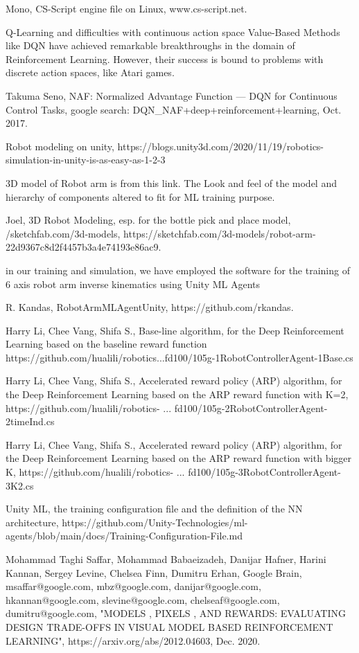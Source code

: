 \documentclass[conference]{IEEEtran}
\begin{document}
\begin{thebibliography}{1}
Mono, CS-Script engine file on Linux, 
www.cs-script.net.  

Q-Learning and difficulties with continuous action space
Value-Based Methods like DQN have achieved remarkable breakthroughs in the domain of Reinforcement Learning. However, their success is bound to problems with discrete action spaces, like Atari games.

Takuma Seno, 
NAF: Normalized Advantage Function — DQN for Continuous Control Tasks, 
google search: DQN\_NAF+deep+reinforcement+learning, 
Oct. 2017.   

Robot modeling on unity,  
https://blogs.unity3d.com/2020/11/19/robotics-simulation-in-unity-is-as-easy-as-1-2-3 

3D model of Robot arm is from this link. The Look and feel of the model and hierarchy of components altered to fit for ML training purpose.

Joel, 3D Robot Modeling, esp. for the bottle pick and place model, 
/sketchfab.com/3d-models, 
https://sketchfab.com/3d-models/robot-arm-22d9367c8d2f4457b3a4e74193e86ac9. 

in our training and simulation, we have employed the software for the
training of 6 axis robot arm inverse kinematics using Unity ML Agents

R. Kandas, RobotArmMLAgentUnity, https://github.com/rkandas. 

Harry Li, Chee Vang, Shifa S., Base-line algorithm, for the 
Deep Reinforcement Learning based on the baseline reward function 
https://github.com/hualili/robotics...fd100/105g-1RobotControllerAgent-1Base.cs

Harry Li, Chee Vang, Shifa S., Accelerated reward policy (ARP) algorithm, 
for the Deep Reinforcement Learning based on the ARP reward function
with K=2,   https://github.com/hualili/robotics- ...
fd100/105g-2RobotControllerAgent-2timeInd.cs 

Harry Li, Chee Vang, Shifa S., Accelerated reward policy (ARP) algorithm, 
for the Deep Reinforcement Learning based on the ARP reward function
with bigger K,    
https://github.com/hualili/robotics- ...
fd100/105g-3RobotControllerAgent-3K2.cs

Unity ML, the training configuration file and the definition of 
the NN architecture, 
https://github.com/Unity-Technologies/ml-agents/blob/main/docs/Training-Configuration-File.md 


Mohammad Taghi Saffar, Mohammad Babaeizadeh, Danijar Hafner, Harini Kannan, 
Sergey Levine, Chelsea Finn, Dumitru Erhan, Google Brain, 
msaffar@google.com, mbz@google.com, danijar@google.com, 
hkannan@google.com, slevine@google.com, chelseaf@google.com, dumitru@google.com, 
"MODELS , PIXELS , AND REWARDS:
EVALUATING DESIGN TRADE-OFFS IN
VISUAL MODEL BASED REINFORCEMENT LEARNING", 
https://arxiv.org/abs/2012.04603,
Dec. 2020. 


\end{thebibliography}
\end{document}
